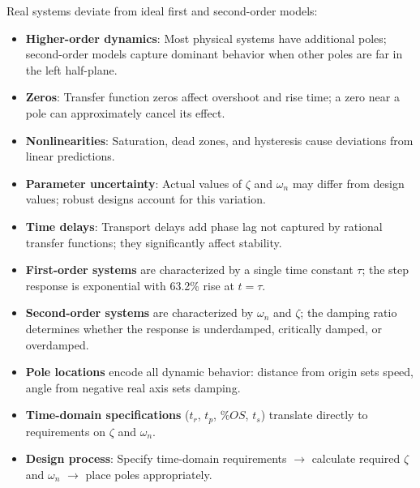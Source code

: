 \begin{practicalbox}
Real systems deviate from ideal first and second-order models:
\begin{itemize}
    \item \textbf{Higher-order dynamics}: Most physical systems have additional poles; second-order models capture dominant behavior when other poles are far in the left half-plane.
    \item \textbf{Zeros}: Transfer function zeros affect overshoot and rise time; a zero near a pole can approximately cancel its effect.
    \item \textbf{Nonlinearities}: Saturation, dead zones, and hysteresis cause deviations from linear predictions.
    \item \textbf{Parameter uncertainty}: Actual values of $\zeta$ and $\omega_n$ may differ from design values; robust designs account for this variation.
    \item \textbf{Time delays}: Transport delays add phase lag not captured by rational transfer functions; they significantly affect stability.
\end{itemize}
\end{practicalbox}

\begin{keyconceptbox}[title=Chapter Summary: Key Takeaways]
\begin{itemize}
    \item \textbf{First-order systems} are characterized by a single time constant $\tau$; the step response is exponential with 63.2\% rise at $t = \tau$.
    \item \textbf{Second-order systems} are characterized by $\omega_n$ and $\zeta$; the damping ratio determines whether the response is underdamped, critically damped, or overdamped.
    \item \textbf{Pole locations} encode all dynamic behavior: distance from origin sets speed, angle from negative real axis sets damping.
    \item \textbf{Time-domain specifications} ($t_r$, $t_p$, $\%OS$, $t_s$) translate directly to requirements on $\zeta$ and $\omega_n$.
    \item \textbf{Design process}: Specify time-domain requirements $\rightarrow$ calculate required $\zeta$ and $\omega_n$ $\rightarrow$ place poles appropriately.
\end{itemize}
\end{keyconceptbox}

